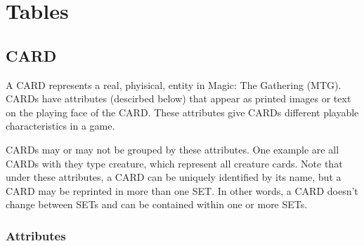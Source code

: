 \documentclass{article}
\newcommand{\tablesection}[2] {
    \subsection{#1}  %
    #2  %
    \subsubsection{Attributes}
}
\begin{document}

\section{Tables}
\tablesection{CARD}{
    
        A CARD represents a real, phyisical, entity in Magic: The Gathering (MTG). CARDs have attributes (descirbed below) that appear as printed images or text on the playing face of the CARD. These attributes give CARDs different playable characteristics in a game.

    CARDs may or may not be grouped by these attributes. One example are all CARDs with they type creature, which represent all creature cards.  Note that under these attributes, a CARD can be uniquely identified by its name, but a CARD may be reprinted in more than one SET.  In other words, a CARD doesn't change between SETs and can be contained within one or more SETs.
}
\end{document}

